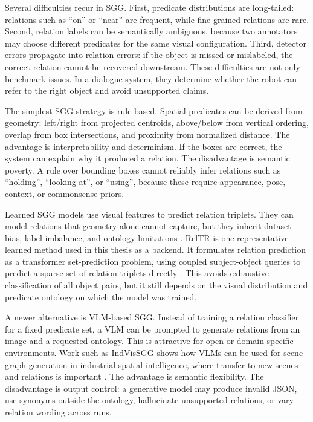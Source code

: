 Several difficulties recur in SGG. First, predicate distributions are long-tailed: relations such as \enquote{on} or \enquote{near} are frequent, while fine-grained relations are rare. Second, relation labels can be semantically ambiguous, because two annotators may choose different predicates for the same visual configuration. Third, detector errors propagate into relation errors: if the object is missed or mislabeled, the correct relation cannot be recovered downstream. These difficulties are not only benchmark issues. In a dialogue system, they determine whether the robot can refer to the right object and avoid unsupported claims.

The simplest SGG strategy is rule-based. Spatial predicates can be derived from geometry: left/right from projected centroids, above/below from vertical ordering, overlap from box intersections, and proximity from normalized distance. The advantage is interpretability and determinism. If the boxes are correct, the system can explain why it produced a relation. The disadvantage is semantic poverty. A rule over bounding boxes cannot reliably infer relations such as \enquote{holding}, \enquote{looking at}, or \enquote{using}, because these require appearance, pose, context, or commonsense priors.

Learned SGG models use visual features to predict relation triplets. They can model relations that geometry alone cannot capture, but they inherit dataset bias, label imbalance, and ontology limitations \cite{zhu_scene_2022}. RelTR is one representative learned method used in this thesis as a backend. It formulates relation prediction as a transformer set-prediction problem, using coupled subject-object queries to predict a sparse set of relation triplets directly \cite{cong_reltr_2023}. This avoids exhaustive classification of all object pairs, but it still depends on the visual distribution and predicate ontology on which the model was trained.

A newer alternative is VLM-based SGG. Instead of training a relation classifier for a fixed predicate set, a VLM can be prompted to generate relations from an image and a requested ontology. This is attractive for open or domain-specific environments. Work such as IndVisSGG shows how VLMs can be used for scene graph generation in industrial spatial intelligence, where transfer to new scenes and relations is important \cite{wang_indvissgg_2025}. The advantage is semantic flexibility. The disadvantage is output control: a generative model may produce invalid JSON, use synonyms outside the ontology, hallucinate unsupported relations, or vary relation wording across runs.

